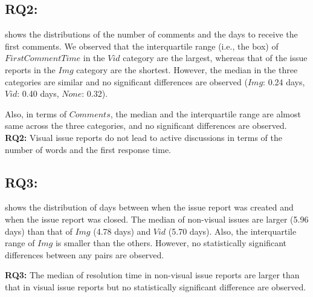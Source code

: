 \subsection*{RQ2: \RQtwo{}}


 shows the distributions of the number of comments and the days to receive the first comments. 
We observed that the interquartile range (i.e., the box) of $FirstCommentTime$ in the $Vid$ category are the largest, whereas that of the issue reports in the $Img$ category are the shortest. 
However, the median in the three categories are similar and no significant differences are observed ($Img$: 0.24 days, $Vid$: 0.40 days, $None$: 0.32). 

Also, in terms of $Comments$, the median and the interquartile range are almost same across the three categories, and no significant differences are observed. 
\vspace{-0.2cm}%
\summarybox
{{\bf RQ2: }{
    Visual issue reports do not lead to active discussions in terms of the number of words and the first response time. 
}}
\subsection*{RQ3: \RQthree{}}
 shows the distribution of days between when the issue report was created and when the issue report was closed. The median of non-visual issues are larger (5.96 days) than that of $Img$ (4.78 days) and $Vid$ (5.70 days). Also, the interquartile range of $Img$ is smaller than the others. However, no statistically significant differences between any pairs are observed.  

\vspace{-0.2cm}%
\summarybox
{{\bf RQ3: }{
The median of resolution time in non-visual issue reports are larger than that in visual issue reports but no statistically significant difference are observed. 
}}





